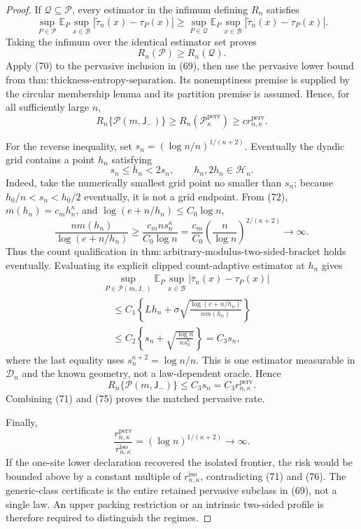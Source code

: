 \documentclass{article}
\begin{document}
\begin{proof}
If \(\mathcal Q\subseteq\mathcal P\), every estimator in the infimum
defining \(R_n\) satisfies
\[
 \sup_{P\in\mathcal P}\mathbb E_P\sup_{x\in\mathcal B}
 |\widetilde\tau_n(x)-\tau_P(x)|
 \ge
 \sup_{P\in\mathcal Q}\mathbb E_P\sup_{x\in\mathcal B}
 |\widetilde\tau_n(x)-\tau_P(x)|.
\]
Taking the infimum over the identical estimator set proves
\[
 R_n(\mathcal P)\ge R_n(\mathcal Q).
 \tag{70}
\]
Apply (70) to the pervasive inclusion in (69), then use the pervasive
lower bound from
\(\mathrm{thm:thickness\text{-}entropy\text{-}separation}\).  Its
nonemptiness premise is supplied by the circular membership lemma and
its partition premise is assumed.  Hence, for all sufficiently large
\(n\),
\[
 R_n\{\mathcal P(m,\mathsf J_{-})\}
 \ge R_n(\mathcal P_\kappa^{\mathrm{perv}})
 \ge c r_{n,\kappa}^{\mathrm{perv}}.
 \tag{71}
\]

For the reverse inequality, set
\(s_n=(\log n/n)^{1/(\kappa+2)}\).  Eventually the dyadic grid contains
a point \(h_n\) satisfying
\[
 s_n\le h_n<2s_n,
 \qquad h_n,2h_n\in\mathcal H_n.
 \tag{72}
\]
Indeed, take the numerically smallest grid point no smaller than \(s_n\);
because \(h_0/n<s_n<h_0/2\) eventually, it is not a grid endpoint.  From
(72), \(m(h_n)=c_mh_n^\kappa\), and
\(\log(e+n/h_n)\le C_0\log n\),
\[
 \frac{nm(h_n)}{\log(e+n/h_n)}
 \ge\frac{c_mns_n^\kappa}{C_0\log n}
 =\frac{c_m}{C_0}
 \left(\frac n{\log n}\right)^{2/(\kappa+2)}
 \longrightarrow\infty.
 \tag{73}
\]
Thus the count qualification in
\(\mathrm{thm:arbitrary\text{-}modulus\text{-}two\text{-}sided\text{-}bracket}\)
holds eventually.  Evaluating its explicit clipped count-adaptive
estimator at \(h_n\) gives
\[
 \begin{aligned}
 &\sup_{P\in\mathcal P(m,\mathsf J_{-})}
 \mathbb E_P\sup_{x\in\mathcal B}
 |\overline\tau_n(x)-\tau_P(x)|\\
 &\quad\le C_1\left\{Lh_n+
 \sigma\sqrt{\frac{\log(e+n/h_n)}{nm(h_n)}}\right\}\\
 &\quad\le C_2\left\{s_n+
 \sqrt{\frac{\log n}{ns_n^\kappa}}\right\}
 =C_3s_n,
 \end{aligned}
 \tag{74}
\]
where the last equality uses \(s_n^{\kappa+2}=\log n/n\).  This is one
estimator measurable in \(\mathcal D_n\) and the known geometry, not a
law-dependent oracle.  Hence
\[
 R_n\{\mathcal P(m,\mathsf J_{-})\}
 \le C_3s_n=C_3r_{n,\kappa}^{\mathrm{perv}}.
 \tag{75}
\]
Combining (71) and (75) proves the matched pervasive rate.

Finally,
\[
 \frac{r_{n,\kappa}^{\mathrm{perv}}}{r_{n,\kappa}^{\mathrm{iso}}}
 =(\log n)^{1/(\kappa+2)}\longrightarrow\infty.
 \tag{76}
\]
If the one-site lower declaration recovered the isolated frontier, the
risk would be bounded above by a constant multiple of
\(r_{n,\kappa}^{\mathrm{iso}}\), contradicting (71) and (76).  The
generic-class certificate is the entire retained pervasive subclass in
(69), not a single law.  An upper packing restriction or an intrinsic
two-sided profile is therefore required to distinguish the regimes.
\end{proof}
\end{document}
